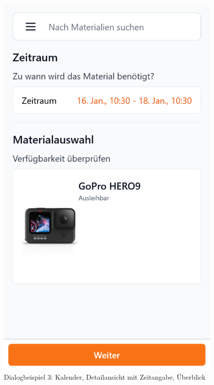 \begin{figure}[p]
    \includegraphics[scale=0.17]{Bilder/Dialgobeispiel/Falsche Uhrzeit.png}
    \caption{Dialogbeispiel 3: Kalender, Detailansicht mit Zeitangabe, Überblick}\label{fig:datum}
\end{figure}
